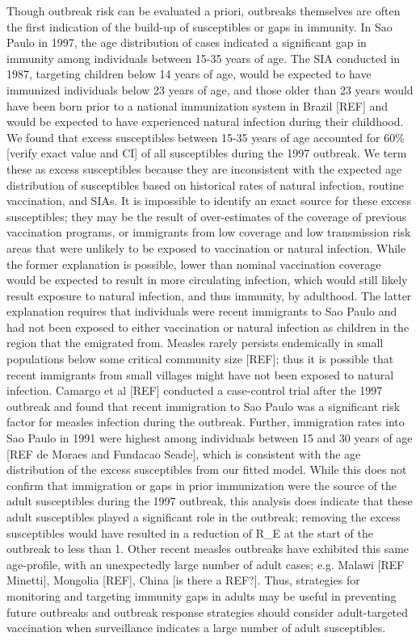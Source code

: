 Though outbreak risk can be evaluated a priori, outbreaks themselves are
often the first indication of the build-up of susceptibles or gaps in
immunity. In Sao Paulo in 1997, the age distribution of cases indicated
a significant gap in immunity among individuals between 15-35 years of
age. The SIA conducted in 1987, targeting children below 14 years of
age, would be expected to have immunized individuals below 23 years of
age, and those older than 23 years would have been born prior to a
national immunization system in Brazil {[}REF{]} and would be expected
to have experienced natural infection during their childhood. We found
that excess susceptibles between 15-35 years of age accounted for 60\%
{[}verify exact value and CI{]} of all susceptibles during the 1997
outbreak. We term these as excess susceptibles because they are
inconsistent with the expected age distribution of susceptibles based on
historical rates of natural infection, routine vaccination, and SIAs. It
is impossible to identify an exact source for these excess susceptibles;
they may be the result of over-estimates of the coverage of previous
vaccination programs, or immigrants from low coverage and low
transmission risk areas that were unlikely to be exposed to vaccination
or natural infection. While the former explanation is possible, lower
than nominal vaccination coverage would be expected to result in more
circulating infection, which would still likely result exposure to
natural infection, and thus immunity, by adulthood. The latter
explanation requires that individuals were recent immigrants to Sao
Paulo and had not been exposed to either vaccination or natural
infection as children in the region that the emigrated from. Measles
rarely persists endemically in small populations below some critical
community size {[}REF{]}; thus it is possible that recent immigrants
from small villages might have not been exposed to natural infection.
Camargo et al {[}REF{]} conducted a case-control trial after the 1997
outbreak and found that recent immigration to Sao Paulo was a
significant risk factor for measles infection during the outbreak.
Further, immigration rates into Sao Paulo in 1991 were highest among
individuals between 15 and 30 years of age {[}REF de Moraes and Fundacao
Seade{]}, which is consistent with the age distribution of the excess
susceptibles from our fitted model. While this does not confirm that
immigration or gaps in prior immunization were the source of the adult
susceptibles during the 1997 outbreak, this analysis does indicate that
these adult susceptibles played a significant role in the outbreak;
removing the excess susceptibles would have resulted in a reduction of
R\_E at the start of the outbreak to less than 1. Other recent measles
outbreaks have exhibited this same age-profile, with an unexpectedly
large number of adult cases; e.g. Malawi {[}REF Minetti{]}, Mongolia
{[}REF{]}, China {[}is there a REF?{]}. Thus, strategies for monitoring
and targeting immunity gaps in adults may be useful in preventing future
outbreaks and outbreak response strategies should consider
adult-targeted vaccination when surveillance indicates a large number of
adult susceptibles.

